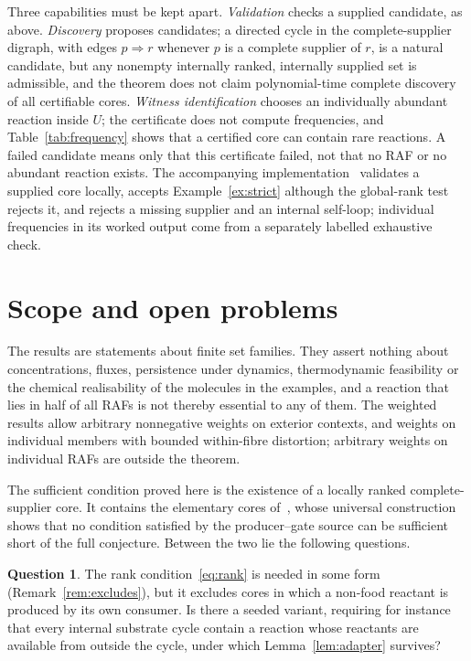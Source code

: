 \documentclass[11pt,a4paper]{article}
\theoremstyle{plain}
\theoremstyle{definition}
\newtheorem{question}[theorem]{Question}
\theoremstyle{remark}
\begin{document}
Three capabilities must be kept apart. \emph{Validation} checks a supplied candidate, as above. \emph{Discovery} proposes candidates; a directed cycle in the complete-supplier digraph, with edges $p\Rightarrow r$ whenever $p$ is a complete supplier of $r$, is a natural candidate, but any nonempty internally ranked, internally supplied set is admissible, and the theorem does not claim polynomial-time complete discovery of all certifiable cores. \emph{Witness identification} chooses an individually abundant reaction inside $U$; the certificate does not compute frequencies, and Table~\ref{tab:frequency} shows that a certified core can contain rare reactions. A failed candidate means only that this certificate failed, not that no RAF or no abundant reaction exists. The accompanying implementation~\cite{repository2026} validates a supplied core locally, accepts Example~\ref{ex:strict} although the global-rank test rejects it, and rejects a missing supplier and an internal self-loop; individual frequencies in its worked output come from a separately labelled exhaustive check.

\section{Scope and open problems}\label{sec:scope}

The results are statements about finite set families. They assert nothing about concentrations, fluxes, persistence under dynamics, thermodynamic feasibility or the chemical realisability of the molecules in the examples, and a reaction that lies in half of all RAFs is not thereby essential to any of them. The weighted results allow arbitrary nonnegative weights on exterior contexts, and weights on individual members with bounded within-fibre distortion; arbitrary weights on individual RAFs are outside the theorem.

The sufficient condition proved here is the existence of a locally ranked complete-supplier core. It contains the elementary cores of~\cite{elementary2026}, whose universal construction shows that no condition satisfied by the producer--gate source can be sufficient short of the full conjecture. Between the two lie the following questions.

\begin{question}
The rank condition~\eqref{eq:rank} is needed in some form (Remark~\ref{rem:excludes}), but it excludes cores in which a non-food reactant is produced by its own consumer. Is there a seeded variant, requiring for instance that every internal substrate cycle contain a reaction whose reactants are available from outside the cycle, under which Lemma~\ref{lem:adapter} survives?
\end{question}
\end{document}
